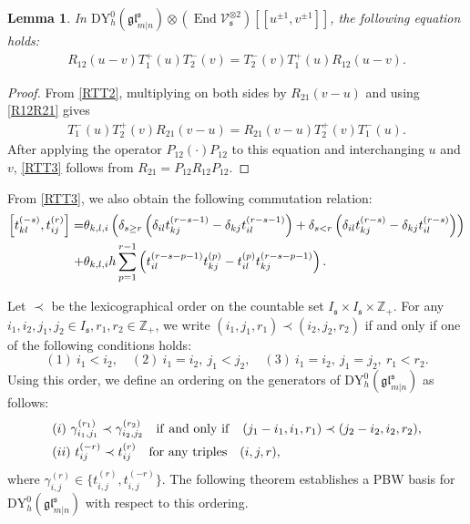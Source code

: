 \documentclass[a4paper,12pt]{article}
\newtheorem{lemm}[theo]{Lemma}
\numberwithin{equation}{section}
\begin{document}
\begin{lemm}
In $\mathrm{DY}_{h}^{0}(\mathfrak{gl}_{m|n}^{\mathfrak{s}})\otimes
(\operatorname{End} \mathcal{V}_{\mathfrak{s}}^{\otimes 2})[[u^{\pm 1},v^{\pm 1}]]$, the following equation holds:
\begin{align}\label{RTT3}
R_{12}(u-v)T_{1}^{+}(u)T_{2}^{-}(v)=T_{2}^{-}(v)T_{1}^{+}(u)R_{12}(u-v).
\end{align}
\end{lemm}
\begin{proof}
From \eqref{RTT2}, multiplying on both sides by $R_{21}(v-u)$ and using \eqref{R12R21} gives
\begin{align*}
T_{1}^{-}(u)T_{2}^{+}(v)R_{21}(v-u)=R_{21}(v-u)T_{2}^{+}(v)T_{1}^{-}(u).
\end{align*}
After applying the operator $P_{12}(\cdot)P_{12}$ to this equation and interchanging $u$ and $v$, \eqref{RTT3} follows from $R_{21}=P_{12}R_{12}P_{12}$.
\end{proof}

From \eqref{RTT3}, we also obtain the following commutation relation:
\begin{align}\notag
\left[t_{kl}^{(-s)},t_{ij}^{(r)}\right]=&\theta_{k,l,i}\left(\delta_{s \geq r}\left(\delta_{il}t_{kj}^{(r-s-1)}-\delta_{kj}t_{il}^{(r-s-1)}\right)+
\delta_{s < r}\left(\delta_{il}t_{kj}^{(r-s)}-\delta_{kj}t_{il}^{(r-s)}\right)\right)\\ \label{t2}
+&\theta_{k,l,i}h\sum_{p=1}^{r-1}\left(t_{il}^{(r-s-p-1)}t_{kj}^{(p)}-
t_{il}^{(p)}t_{kj}^{(r-s-p-1)}\right).
\end{align}

Let $\prec$ be the lexicographical order on the countable set $I_{\mathfrak{s}}\times I_{\mathfrak{s}} \times \mathbb{Z}_{+}$. For any $i_1,i_2,j_1,j_2 \in I_{\mathfrak{s}},r_1,r_2 \in \mathbb{Z}_{+}$, we write $(i_1,j_1,r_1)\prec(i_2,j_2,r_2)$ if and only if one of the following conditions holds:
$$
(1)~i_1<i_2,\quad(2)~i_1=i_2,~ j_1<j_2,\quad (3)~i_1=i_2,~ j_1=j_2,~r_1<r_2.
$$
Using this order, we define an ordering on the generators of $\mathrm{DY}_{h}^{0}(\mathfrak{gl}^{\mathfrak{s}}_{m|n})$ as follows:
\begin{align*}
&(i)~\gamma_{i_1,j_1}^{(r_1)}\prec \gamma_{i_2,j_2}^{(r_2)} \quad {\rm if~and~only~if}\quad (j_1-i_1,i_1,r_1)\prec (j_2-i_2,i_2,r_2),\\
&(ii)~t_{ij}^{(-r)}\prec t_{ij}^{(r)}\quad {\rm for~any~triples}\quad (i,j,r),
\end{align*}
where $\gamma_{i,j}^{(r)}\in\{t_{i,j}^{(r)},t_{i,j}^{(-r)}\}$. The following theorem establishes a PBW basis for $\mathrm{DY}_{h}^{0}(\mathfrak{gl}^{\mathfrak{s}}_{m|n})$ with respect to this ordering.
\end{document}
